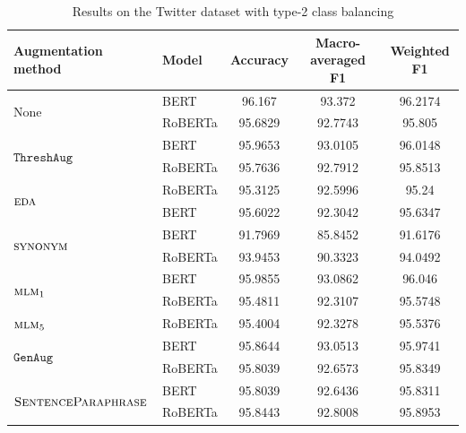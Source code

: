 \documentclass[11pt,a4paper]{article}
\newcommand{\noaug}{$\textrm{None}$}
\newcommand{\senttfpara}{$\textsc{SentenceParaphrase}$}
\newcommand{\eda}{$\textsc{eda}$}
\newcommand{\synonym}{$\textsc{synonym}$}
\newcommand{\mlmone}{$\textsc{mlm}_1$}
\newcommand{\mlmfive}{$\textsc{mlm}_5$}
\newcommand{\genaug}{$\texttt{GenAug}$}
\newcommand{\threshaug}{$\texttt{ThreshAug}$}
\begin{document}
\begin{table}[]
    \small 
    \centering
    \begin{tabular}{llccc}
        \toprule
        \textbf{Augmentation method} & \textbf{Model} & \textbf{Accuracy} & \textbf{Macro-averaged F1} & \textbf{Weighted F1} \\
        \midrule
        \multirow{2}{*}{\noaug} & BERT & 96.167 & 93.372 & 96.2174 \\
         & RoBERTa & 95.6829 & 92.7743 & 95.805 \\\midrule

        \multirow{2}{*}{\threshaug} & BERT & 95.9653 & 93.0105 & 96.0148 \\
         & RoBERTa & 95.7636 & 92.7912 & 95.8513 \\\cmidrule{2-5}
        \multirow{2}{*}{\eda} & RoBERTa & 95.3125 & 92.5996 & 95.24 \\
         & BERT & 95.6022 & 92.3042 & 95.6347 \\\midrule

        \multirow{2}{*}{\synonym} & BERT & 91.7969 & 85.8452 & 91.6176 \\
         & RoBERTa & 93.9453 & 90.3323 & 94.0492 \\\cmidrule{2-5}
        \multirow{2}{*}{\mlmone} & BERT & 95.9855 & 93.0862 & 96.046 \\
         & RoBERTa & 95.4811 & 92.3107 & 95.5748 \\\cmidrule{2-5}
        \mlmfive & RoBERTa & 95.4004 & 92.3278 & 95.5376 \\\midrule
        
        \multirow{2}{*}{\genaug} & BERT & 95.8644 & 93.0513 & 95.9741 \\
         & RoBERTa & 95.8039 & 92.6573 & 95.8349 \\\midrule
         
        \multirow{2}{*}{\senttfpara} & BERT & 95.8039 & 92.6436 & 95.8311 \\
         & RoBERTa & 95.8443 & 92.8008 & 95.8953 \\
        \bottomrule
    \end{tabular}
    \caption{Results on the Twitter dataset with type-2 class balancing}
    \label{tab:twitter2}
\end{table}
\end{document}
